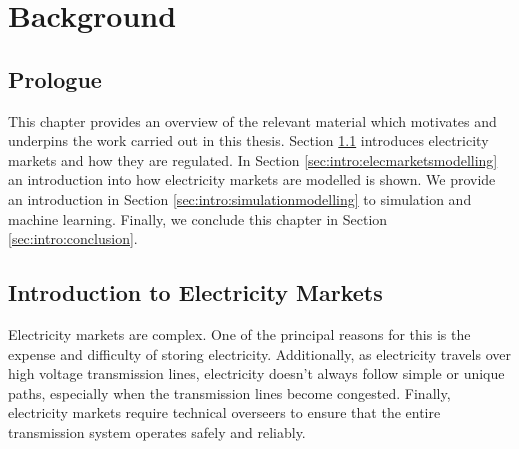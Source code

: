
\chapter{Background}
\label{chapter:background}
\ifpdf
    \graphicspath{{Chapter2/Figs/Raster/}{Chapter2/Figs/PDF/}{Chapter2/Figs/}}
\else
    \graphicspath{{Chapter2/Figs/Vector/}{Chapter2/Figs/}}
\fi


\section*{Prologue}

This chapter provides an overview of the relevant material which motivates and underpins the work carried out in this thesis. Section \ref{sec:intro:elecmarkets} introduces electricity markets and how they are regulated. In Section \ref{sec:intro:elecmarketsmodelling} an introduction into how electricity markets are modelled is shown. We provide an introduction in Section \ref{sec:intro:simulationmodelling} to simulation and machine learning. Finally, we conclude this chapter in Section \ref{sec:intro:conclusion}.


%

\section{Introduction to Electricity Markets}
\label{sec:intro:elecmarkets}

Electricity markets are complex. One of the principal reasons for this is the expense and difficulty of storing electricity. Additionally, as electricity travels over high voltage transmission lines, electricity doesn't always follow simple or unique paths, especially when the transmission lines become congested. Finally, electricity markets require technical overseers to ensure that the entire transmission system operates safely and reliably. 

